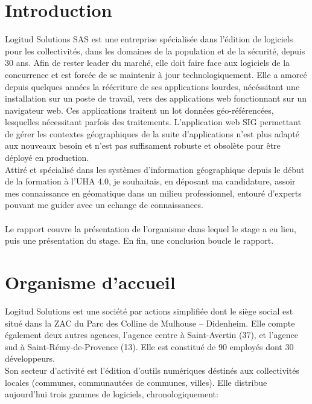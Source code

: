 \documentclass{rapportUHA40}
\begin{document}

\tabledematieres%

\setcounter{figure}{0}%


\section{Introduction}
Logitud Solutions SAS est une entreprise spécialisée dans l'édition de
logiciels pour les collectivités, dans les domaines de la population et de la
sécurité, depuis 30 ans. Afin de rester leader du marché, elle doit faire face
aux logiciels de la concurrence et est forcée de se maintenir à jour
technologiquement. Elle a amorcé depuis quelques années la réécriture de ses
applications lourdes, nécéssitant une installation sur un poste de travail,
vers des applications web fonctionnant sur un navigateur web. Ces applications
traitent un lot données géo-référencées, lesquelles nécessitant parfois des
traitements. L'application web SIG permettant de gérer les contextes
géographiques de la suite d'applications n'est plus adapté aux nouveaux besoin
et n'est pas suffisament robuste et obsolète pour être déployé en production.
\\

Attiré et spécialisé dans les systèmes d'information géographique depuis le
début de la formation à l'UHA 4.0, je souhaitais, en déposant ma candidature,
assoir mes connaissance en géomatique dans un milieu professionnel, entouré
d'experts pouvant me guider avec un echange de connaissances. \\\\

Le rapport couvre la présentation de l'organisme dans lequel le stage a eu
lieu, puis une présentation du stage. En fin, une conclusion boucle le rapport.

\newpage

\section{Organisme d'accueil}
Logitud Solutions est une société par actions simplifiée dont le siège social
est situé dans la ZAC du Parc des Colline de Mulhouse – Didenheim. Elle compte
également deux autres agences, l'agence centre à Saint-Avertin (37), et
l’agence sud à Saint-Rémy-de-Provence (13). Elle est constitué de 90 employés
dont 30 développeurs. \\ Son secteur d'activité est l'édition d'outils
numériques déstinés aux collectivités locales (communes, communautées de
communes, villes). Elle distribue aujourd'hui trois gammes de logiciels,
chronologiquement:
\end{document}
